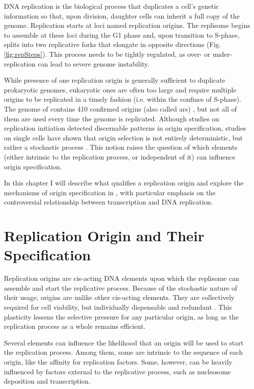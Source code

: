  \label{replicationIntro} 
DNA replication is the biological process that duplicates a cell’s genetic information so that, upon division, daughter cells can inherit a full copy of the genome. 
Replication starts at loci named replication origins. The replisome begins to assemble at these loci during the G1 phase and, upon transition to S-phase, splits into two replicative forks that elongate in opposite directions (Fig. \ref{fig:repSteps}). 
This process needs to be tightly regulated, as over- or under-replication can lead to severe genome instability. 


While presence of one replication origin is generally sufficient to duplicate prokaryotic genomes, eukaryotic ones are often too large and require multiple origins to be replicated in a timely fashion (i.e. within the confines of S-phase). 
The genome of \cer{} contains 410 confirmed origins (also called \gls{ars}) \cite{siow:2012:oridb}, but not all of them are used every time the genome is replicated.
Although studies on replication initiation detected discernable patterns in origin specification, studies on single cells have shown that origin selection is not entirely deterministic, but rather a stochastic process \cite{patel:2006:dna, Czajkowsky:2008:dna}. 
This notion raises the question of which elements (either intrinsic to the replication process, or independent of it) can influence origin specification.

In this chapter I will describe what qualifies a replication origin and explore the mechanisms of origin specification in \cer{}, with particular emphasis on the controversial relationship between transcription and DNA replication.

\section{Replication Origin and Their Specification}

Replication origins are cis-acting DNA elements upon which the replisome can assemble and start the replicative process. Because of the stochastic nature of their usage, origins are unlike other cis-acting elements. 
They are collectively required for cell viability, but individually dispensable and redundant \cite{bogenschutz:2014:initiation, dershowitz:2007:linear}. 
This plasticity lessens the selective pressure for any particular origin, as long as the replication process as a whole remains efficient. 

Several elements can influence the likelihood that an origin will be used to start the replication process. Among them, some are intrinsic to the sequence of each origin, like the affinity for replication factors. Some, however, can be heavily influenced by factors external to the replicative process, such as nucleosome deposition and transcription.

